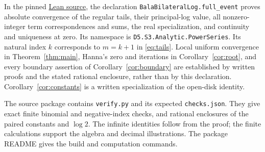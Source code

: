 \documentclass[11pt]{article}
\begin{document}
In the pinned \href{https://github.com/the-omega-institute/trureturing/blob/4a7117cee792c7d5598d7f4770577d557fb45137/D5/S3/Analytic/PowerSeries/BalaBilateralLog.lean#L368}{Lean source},
the declaration \texttt{BalaBilateralLog.full\_event} proves absolute convergence of the
regular tails, their principal-log value, all nonzero-integer term
correspondences and sums, the real specialization, and continuity and
uniqueness at zero. Its namespace is \texttt{D5.S3.Analytic.PowerSeries}.
Its natural index $k$ corresponds to $m=k+1$ in
\eqref{eq:tails}. Local uniform convergence in
Theorem~\ref{thm:main}, Hanna's zero and iterations in
Corollary~\ref{cor:root}, and every boundary assertion of
Corollary~\ref{cor:boundary} are established by written proofs and the
stated rational enclosure, rather than by this declaration.
Corollary~\ref{cor:constants} is a written specialization of the open-disk identity.

The source package contains \texttt{verify.py} and its expected
\texttt{checks.json}. They give exact finite binomial and negative-index
checks, and rational enclosures of the paired constants and $\log2$.
The infinite identities follow from the proof; the finite calculations
support the algebra and decimal illustrations. The package README gives
the build and computation commands.
\end{document}
